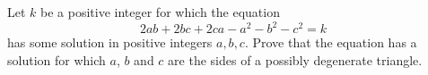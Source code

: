 Let $k$ be a positive integer for which the equation \[ 2ab+2bc+2ca-a^2-b^2-c^2 = k \] has some solution in positive integers $a,b,c$. Prove that the equation has a solution for which $a$, $b$ and $c$ are the sides of a possibly degenerate triangle.
